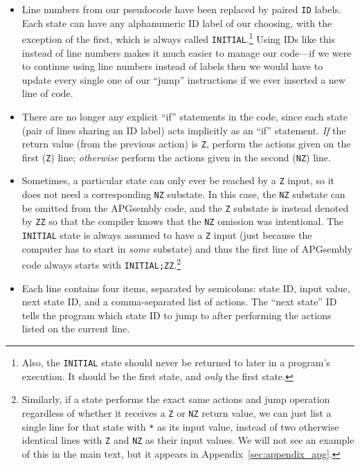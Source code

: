 \begin{itemize}
	\item Line numbers from our pseudocode have been replaced by paired \texttt{ID} labels. Each state can have any alphanumeric ID label of our choosing, with the exception of the first, which is always called \texttt{INITIAL}.\footnote{Also, the \texttt{INITIAL} state should never be returned to later in a program's execution. It should be the first state, and \emph{only} the first state.} Using IDs like this instead of line numbers makes it much easier to manage our code---if we were to continue using line numbers instead of labels then we would have to update every single one of our ``jump'' instructions if we ever inserted a new line of code.\smallskip
	
	\item There are no longer any explicit ``if'' statements in the code, since each state (pair of lines sharing an ID label) acts implicitly as an ``if'' statement. \emph{If} the return value (from the previous action) is \texttt{Z}, perform the actions given on the first (\texttt{Z}) line; \emph{otherwise} perform the actions given in the second (\texttt{NZ}) line.\smallskip
	
	\item Sometimes, a particular state can only ever be reached by a \texttt{Z} input, so it does not need a corresponding \texttt{NZ} substate. In this case, the \texttt{NZ} substate can be omitted from the APGsembly code, and the \texttt{Z} substate is instead denoted by \texttt{ZZ} so that the compiler knows that the \texttt{NZ} omission was intentional. The \texttt{INITIAL} state is always assumed to have a \texttt{Z} input (just because the computer has to start in \emph{some} substate) and thus the first line of APGsembly code always starts with \texttt{INITIAL;ZZ}.\footnote{Similarly, if a state performs the exact same actions and jump operation regardless of whether it receives a \texttt{Z} or \texttt{NZ} return value, we can just list a single line for that state with \texttt{*} as its input value, instead of two otherwise identical lines with \texttt{Z} and \texttt{NZ} as their input values. We will not see an example of this in the main text, but it appears in Appendix~\ref{sec:appendix_apg}.}\smallskip
	
	\item Each line contains four items, separated by semicolons: state ID, input value, next state ID, and a comma-separated list of actions. The ``next state'' ID tells the program which state ID to jump to after performing the actions listed on the current line.\smallskip
	

\end{itemize}
